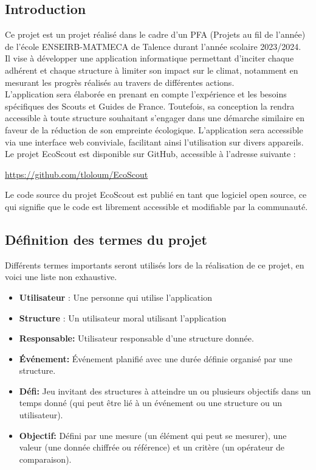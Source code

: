 \subsection{Introduction}
Ce projet est un projet réalisé dans le cadre d'un PFA (Projets au fil de l'année)
de l'école ENSEIRB-MATMECA de Talence durant l'année scolaire 2023/2024. \\
\newline
Il vise à développer une application informatique permettant d’inciter chaque adhérent
et chaque structure à limiter son impact sur le climat, notamment en mesurant les 
progrès réalisés au travers de différentes actions. \\L'application sera élaborée en prenant en compte l'expérience et les besoins spécifiques des Scouts et Guides de France. Toutefois, sa conception la rendra accessible à toute structure souhaitant s'engager dans une démarche similaire en faveur de la réduction de son empreinte écologique. L'application sera accessible via une interface web conviviale, facilitant ainsi l'utilisation sur divers appareils. 
\\
\newline
Le projet EcoScout est disponible sur GitHub, accessible à l'adresse suivante :
\begin{center}
    \url{https://github.com/tloloum/EcoScout}
\end{center}
Le code source du projet EcoScout est publié en tant que logiciel open source, 
ce qui signifie que le code est librement accessible et modifiable par la communauté. 


\subsection{Définition des termes du projet}

Différents termes importants seront utilisés lors de la réalisation de ce projet, en voici une liste non exhaustive.
\begin{itemize}
    \item \textbf{Utilisateur} : Une personne qui utilise l'application
    \item \textbf{Structure} : Un utilisateur moral utilisant l'application
    \item \textbf{Responsable:} Utilisateur responsable d'une structure donnée.
    \item \textbf{Événement:} Événement planifié avec une durée définie organisé par une structure.
    \item \textbf{Défi:} Jeu invitant des structures à atteindre un ou plusieurs objectifs dans un temps donné (qui peut être lié à un événement ou une structure ou un utilisateur).
    \item \textbf{Objectif:} Défini par une mesure (un élément qui peut se mesurer), une valeur (une donnée chiffrée ou référence) 
    et un critère (un opérateur de comparaison). 
\end{itemize}

